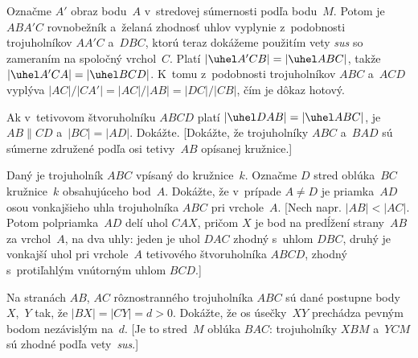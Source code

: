 {Označme $A'$ obraz bodu~$A$ v~stredovej súmernosti podľa bodu~$M$. Potom
je $ABA'C$ rovnobežník a~želaná zhodnosť uhlov vyplynie
z~podobnosti trojuholníkov $AA'C$ a~$DBC$, ktorú teraz dokážeme
použitím vety {\it sus\/} so zameraním na spoločný vrchol~$C$.
Platí $|\uhel A'CB|=|\uhel ABC|$, takže $|\uhel A'CA|=|\uhel BCD|$.
K~tomu z~podobnosti trojuholníkov $ABC$ a~$ACD$ vyplýva
$|AC|/|CA'|=|AC|/|AB|=|DC|/|CB|$, čím je dôkaz hotový.


Ak v~tetivovom štvoruholníku $ABCD$ platí $|\uhel DAB|=|\uhel
ABC|$, je $AB\parallel CD$ a~$|BC|=|AD|$. Dokážte. [Dokážte, že
trojuholníky $ABC$ a~$BAD$ sú súmerne združené podľa osi tetivy~$AB$
opísanej kružnice.]

Daný je trojuholník $ABC$ vpísaný do kružnice~$k$. Označme $D$
stred oblúka~$BC$ kružnice~$k$ obsahujúceho bod~$A$. Dokážte, že
v~prípade $A\ne D$ je priamka~$AD$ osou vonkajšieho uhla trojuholníka
$ABC$ pri vrchole~$A$. [Nech napr. $|AB|<|AC|$. Potom polpriamka~$AD$ delí uhol $CAX$, pričom $X$ je bod na predĺžení strany~$AB$
za vrchol~$A$, na dva uhly: jeden je uhol $DAC$ zhodný s~uhlom $DBC$,
druhý je vonkajší uhol pri vrchole~$A$ tetivového štvoruholníka $ABCD$,
zhodný s~protiľahlým vnútorným uhlom $BCD$.]

\D
Na stranách $AB$, $AC$ rôznostranného trojuholníka $ABC$ sú
dané postupne body $X$,~$Y$ tak, že $|BX|=|CY|=d>0$. Dokážte, že os
úsečky~$XY$ prechádza pevným bodom nezávislým na~$d$. [Je to stred~$M$
oblúka $BAC$: trojuholníky $XBM$ a~$YCM$ sú zhodné podľa vety~{\it sus}.]
}

